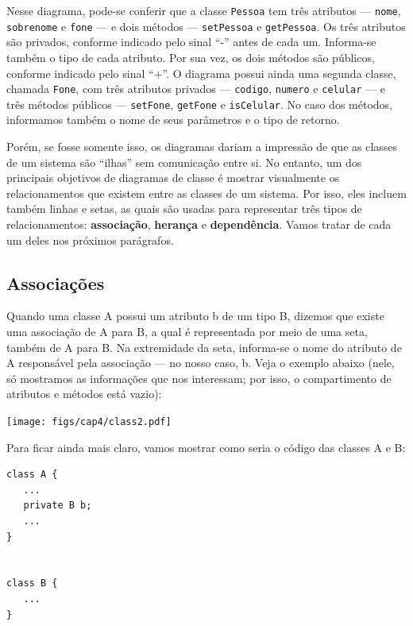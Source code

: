 \documentclass[
  11pt,
  twoside]{book}
\newcommand{\passthrough}[1]{#1}
\begin{document}
Nesse diagrama, pode-se conferir que a classe
\passthrough{\lstinline!Pessoa!} tem três atributos ---
\passthrough{\lstinline!nome!}, \passthrough{\lstinline!sobrenome!} e
\passthrough{\lstinline!fone!} --- e dois métodos ---
\passthrough{\lstinline!setPessoa!} e
\passthrough{\lstinline!getPessoa!}. Os três atributos são privados,
conforme indicado pelo sinal ``-'' antes de cada um. Informa-se também o
tipo de cada atributo. Por sua vez, os dois métodos são públicos,
conforme indicado pelo sinal ``+''. O diagrama possui ainda uma segunda
classe, chamada \passthrough{\lstinline!Fone!}, com três atributos
privados --- \passthrough{\lstinline!codigo!},
\passthrough{\lstinline!numero!} e \passthrough{\lstinline!celular!} ---
e três métodos públicos --- \passthrough{\lstinline!setFone!},
\passthrough{\lstinline!getFone!} e \passthrough{\lstinline!isCelular!}.
No caso dos métodos, informamos também o nome de seus parâmetros e o
tipo de retorno.

Porém, se fosse somente isso, os diagramas dariam a impressão de que as
classes de um sistema são ``ilhas'' sem comunicação entre si. No
entanto, um dos principais objetivos de diagramas de classe é mostrar
visualmente os relacionamentos que existem entre as classes de um
sistema. Por isso, eles incluem também linhas e setas, as quais são
usadas para representar três tipos de relacionamentos:
\textbf{associação}, \textbf{herança} e \textbf{dependência}. Vamos
tratar de cada um deles nos próximos parágrafos.

\hypertarget{associauxe7uxf5es}{%
\subsection{Associações}\label{associauxe7uxf5es}}


Quando uma classe A possui um atributo b de um tipo B, dizemos que
existe uma associação de A para B, a qual é representada por meio de uma
seta, também de A para B. Na extremidade da seta, informa-se o nome do
atributo de A responsável pela associação --- no nosso caso, b. Veja o
exemplo abaixo (nele, só mostramos as informações que nos interessam;
por isso, o compartimento de atributos e métodos está vazio):

\texttt{[image: figs/cap4/class2.pdf]}

Para ficar ainda mais claro, vamos mostrar como seria o código das
classes A e B:

\begin{lstlisting}
class A {
   ...
   private B b;
   ...
}


class B {
   ...
}
\end{lstlisting}
\end{document}
